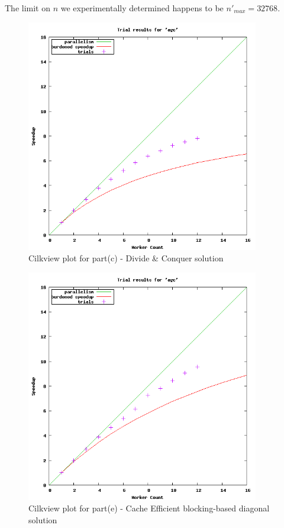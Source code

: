 \documentclass{article}
\begin{document}
The limit on $n$ we experimentally determined happens to be ${n'}_{max} = 32768$.

\begin{figure}
  \begin{center}
    \includegraphics[width=4in]{images/agc-partc.png}
    \caption{Cilkview plot for part(c) - Divide \& Conquer solution}
    \label{fig:cilkview_c}
  \end{center}
\end {figure}

\begin{figure}
  \begin{center}
    \includegraphics[width=4in]{images/agc-parte.png}
    \caption{Cilkview plot for part(e) - Cache Efficient blocking-based diagonal solution}
    \label{fig:cilkview_e}
  \end{center}
\end {figure}
\end{document}
